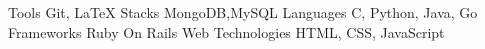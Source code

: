 




  \begin{cvskills}
  \cvskill
    {Tools}
    {Git, LaTeX} 
  \cvskill
    {Stacks}
    {MongoDB,MySQL}
  \cvskill
      {Languages}
      {C, Python, Java, Go}
  \cvskill
    {Frameworks}
    {Ruby On Rails}
  \cvskill
    {Web Technologies}
    {HTML, CSS, JavaScript}

  \end{cvskills}
